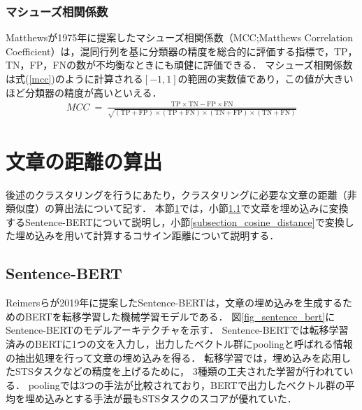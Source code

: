 \documentclass[12pt,a4j]{jreport}
\begin{document}
\subsubsection{マシューズ相関係数}
\label{subsubsection_mcc}
Matthewsが1975年に提案したマシューズ相関係数（MCC;Matthews Correlation Coefficient）は，混同行列を基に分類器の精度を総合的に評価する指標で，TP，TN，FP，FNの数が不均衡なときにも頑健に評価できる\cite{chicco_advantages_2020}．
マシューズ相関係数は式(\ref{mcc})のように計算される$[-1, 1]$の範囲の実数値であり，この値が大きいほど分類器の精度が高いといえる．
\begin{align}
  MCC ~=~ \frac{\mathrm{TP} \times \mathrm{TN}-\mathrm{FP} \times \mathrm{FN}}{\sqrt{(\mathrm{TP}+\mathrm{FP}) \times(\mathrm{TP}+\mathrm{FN}) \times(\mathrm{TN}+\mathrm{FP}) \times(\mathrm{TN}+\mathrm{FN})}}
  \label{mcc}
\end{align}


\section{文章の距離の算出}
\label{section_sentence_distance}
後述のクラスタリングを行うにあたり，クラスタリングに必要な文章の距離（非類似度）の算出法について記す．
本節\ref{section_sentence_distance}では，小節\ref{subsection_sentence_bert}で文章を埋め込みに変換するSentence-BERTについて説明し，小節\ref{subsection_cosine_distance}で変換した埋め込みを用いて計算するコサイン距離について説明する．

\subsection{Sentence-BERT}
\label{subsection_sentence_bert}
Reimersらが2019年に提案したSentence-BERTは，文章の埋め込みを生成するためのBERTを転移学習した機械学習モデルである\cite{reimers_sentence-bert_2019}．
図\ref{fig_sentence_bert}にSentence-BERTのモデルアーキテクチャを示す．
Sentence-BERTでは転移学習済みのBERTに1つの文を入力し，出力したベクトル群にpoolingと呼ばれる情報の抽出処理を行って文章の埋め込みを得る．
転移学習では，埋め込みを応用したSTSタスクなどの精度を上げるために，
3種類の工夫された学習が行われている．
poolingでは3つの手法が比較されており，BERTで出力したベクトル群の平均を埋め込みとする手法が最もSTSタスクのスコアが優れていた．
\end{document}
